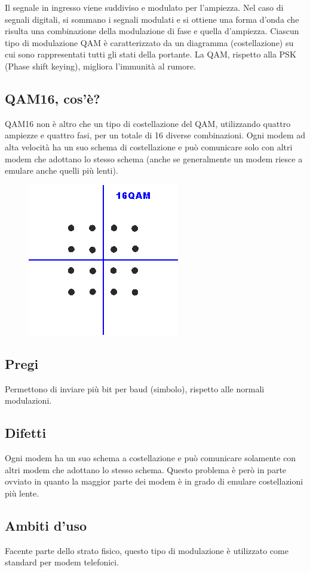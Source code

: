 Il segnale in ingresso viene suddiviso e modulato per l'ampiezza. Nel caso di segnali digitali, si sommano i segnali modulati e si ottiene una forma d'onda che risulta una combinazione della modulazione di fase e quella d'ampiezza.
Ciascun tipo di modulazione QAM è caratterizzato da un diagramma (costellazione) su cui sono rappresentati tutti gli stati della portante.
La QAM, rispetto alla PSK (Phase shift keying), migliora l'immunità al rumore. 
\subsection{QAM16, cos'è?}
QAM16 non è altro che un tipo di costellazione del QAM, utilizzando quattro ampiezze e quattro fasi, per un totale di 16 diverse combinazioni. Ogni modem ad alta velocità ha un suo schema di costellazione e può comunicare solo con altri modem che adottano lo stesso schema (anche se generalmente un modem riesce a emulare anche quelli più lenti).

\begin{figure}[H]
\centering
\includegraphics[scale=0.6]{res/img/12_QAM16.png}
\end{figure}

\subsection{Pregi}
Permettono di inviare più bit per baud (simbolo), rispetto alle normali modulazioni. 
\subsection{Difetti}
Ogni modem ha un suo schema a costellazione e può comunicare solamente con altri modem che adottano lo stesso schema.
Questo problema è però in parte ovviato in quanto la maggior parte dei modem è in grado di emulare costellazioni più lente.
\subsection{Ambiti d'uso}
Facente parte dello strato fisico, questo tipo di modulazione è utilizzato come standard per modem telefonici.

